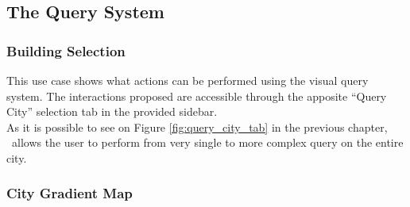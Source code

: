 \subsection{The Query System}
\subsubsection{Building Selection}
This use case shows what actions can be performed using the visual query system. The interactions proposed are accessible through the apposite ``Query City'' selection tab in the provided sidebar.\\
As it is possible to see on Figure \ref{fig:query_city_tab} in the previous chapter, \applicationName\ allows the user to perform from very single to more complex query on the entire city.
\subsubsection{City Gradient Map}